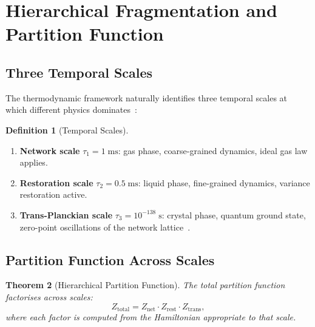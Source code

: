 \documentclass[11pt,twocolumn,a4paper]{article}
\newtheorem{theorem}{Theorem}[section]
\theoremstyle{definition}
\newtheorem{definition}[theorem]{Definition}
\theoremstyle{remark}
\begin{document}
\section{Hierarchical Fragmentation and Partition Function}\label{sec:frag}

\subsection{Three Temporal Scales}\label{sec:three_scales}

The thermodynamic framework naturally identifies three temporal scales at
which different physics dominates~\cite{Sachikonye2024a,Sachikonye2025a}:

\begin{definition}[Temporal Scales]\label{def:scales}
\begin{enumerate}[label=(\roman*)]
  \item \textbf{Network scale} $\tau_1=1\;\mathrm{ms}$:
        gas phase, coarse-grained dynamics, ideal gas law applies.
  \item \textbf{Restoration scale} $\tau_2=0.5\;\mathrm{ms}$:
        liquid phase, fine-grained dynamics, variance restoration active.
  \item \textbf{Trans-Planckian scale}
        $\tau_3=10^{-138}\;\mathrm{s}$:
        crystal phase, quantum ground state, zero-point oscillations
        of the network lattice~\cite{Sachikonye2025b,Sachikonye2025c}.
\end{enumerate}
\end{definition}

\subsection{Partition Function Across Scales}\label{sec:z_total}

\begin{theorem}[Hierarchical Partition Function]\label{thm:z_total}
The total partition function factorises across scales:
\begin{equation}\label{eq:z_total}
  Z_{\mathrm{total}} = Z_{\mathrm{net}}\cdot Z_{\mathrm{rest}}\cdot
  Z_{\mathrm{trans}},
\end{equation}
where each factor is computed from the Hamiltonian appropriate to that scale.
\end{theorem}
\end{document}
